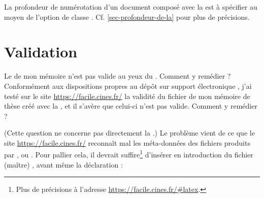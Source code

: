 La profondeur de numérotation d'un document composé avec la \yatCl{} est
à spécifier au moyen de l'option de classe
. Cf. \vref{sec-profondeur-de-la} pour plus de précisions.

\section{Validation}
\label{sec-validation}

\begin{dbfaq}{Le  de mon mémoire n'est pas valide au yeux du
    . Comment y remédier ?}{}
   
  Conformément aux dispositions propres au dépôt sur support électronique
  \autocite{guidoct-abes}, j'ai testé sur le site \url{https://facile.cines.fr/}
  la validité du fichier  de mon mémoire de thèse créé avec la
  \yatCl{}, et il s'avère que celui-ci n'est pas valide. Comment y remédier ?
\end{dbfaq}

(Cette question ne concerne pas directement la \yatCl{}.) Le problème
vient de ce que le site \url{https://facile.cines.fr/} reconnaît mal les
méta-données des fichiers  produits par ,
 ou .
Pour pallier cela, il devrait suffire\footnote{Plus de précisions à l'adresse
  \url{https://facile.cines.fr/\#latex}.} d'insérer en introduction du fichier
(maître) , avant même la déclaration  :
\begin{preamblecode}
\end{preamblecode}


